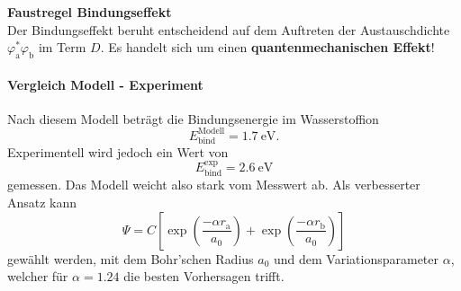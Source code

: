     \begin{important}\unboldmath
        \textbf{Faustregel Bindungseffekt}\\[1ex]
        Der Bindungseffekt beruht entscheidend auf dem Auftreten der Austauschdichte $\varphi_\mathrm{a}^{*} \varphi_\mathrm{b}$ im Term $D$. 
        Es handelt sich um einen \textbf{quantenmechanischen Effekt}!
    \end{important}

\paragraph{Vergleich Modell - Experiment}
    Nach diesem Modell beträgt die Bindungsenergie im Wasserstoffion  
    $$E^\mathrm{Modell}_\mathrm{bind}=\SI{1.7}{\electronvolt}.$$
    Experimentell wird jedoch ein Wert von 
    $$E^\mathrm{exp}_\mathrm{bind}=\SI{2.6}{\electronvolt}$$
    gemessen. Das Modell weicht also stark vom Messwert ab. Als verbesserter Ansatz kann
    $$\Psi = C\left[\exp\left(\frac{-\alpha r_\mathrm a}{a_0}\right) + \exp\left(\frac{-\alpha r_\mathrm b}{a_0}\right) \right]
    $$
    gewählt werden, mit dem Bohr'schen Radius $a_0$ und dem Variationsparameter $\alpha$, welcher für $\alpha=\num{1,24}$ die besten Vorhersagen trifft.
    
